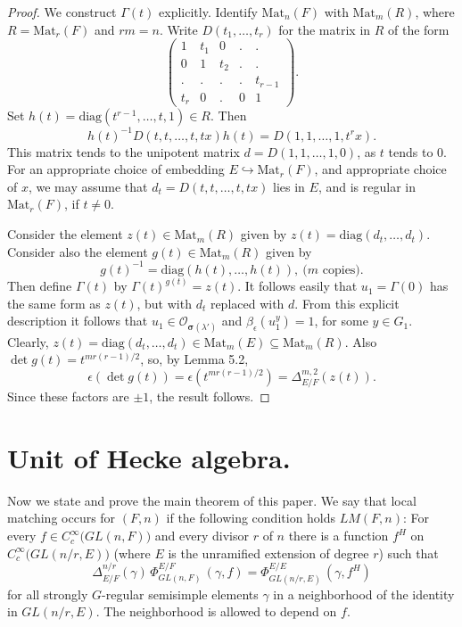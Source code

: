 \documentclass{amsart}
\begin{document}
\begin{proof}  We construct $\Gamma(t)$ explicitly.  Identify
$\text{Mat}_n(F)$ with $\text{Mat}_m(R)$, where $R = \text{Mat}_r(F)$
and $rm=n$.  Write $D(t_1,\ldots,t_r)$ for the matrix in $R$ of the
form
$$\begin{pmatrix} 1& t_1& 0 & . & . \\
	   0& 1  & t_2&. &.  \\
	   .& .  & .  &. &t_{r-1}\\
	   t_r&0 & . & 0 &1\end{pmatrix}.$$
Set $h(t) = \text{diag}(t^{r-1},\ldots,t,1)\in R$.  Then
$$h(t)^{-1}D(t,t,\ldots,t,tx)h(t) = D(1,1,\ldots,1,t^rx).$$  This
matrix tends to the unipotent matrix
  $d = D(1,1,\ldots,1,0)$, as $t$ tends to $0$.  For an
appropriate choice of embedding $E\hookrightarrow \text{Mat}_r(F)$, 
and appropriate
choice of $x$, we may assume that $d_t=D(t,t,\ldots,t,tx)$ lies in $E$,
and is regular in $\text{Mat}_r(F)$, if $t\ne 0$.

Consider the element $z(t) \in \text{Mat}_m(R)$ given by
$z(t) = \text{diag}(d_t,\ldots,d_t)$.
Consider also the element $g(t) \in \text{Mat}_m(R)$ given by
$$g(t)^{-1} = \text{diag}(h(t),\ldots,h(t)),\ \text{($m$ copies)}.$$
Then define $\Gamma(t)$ by
  $\Gamma(t)^{g(t)}= z(t)$.  It follows easily that
$u_1 = \Gamma(0)$ has the same form as $z(t)$, but with $d_t$ replaced
with $d$.  From this explicit description it follows that $u_1\in
{\mathcal O}_{\pmb\sigma(\lambda')}$ and $\beta_\epsilon(u_1^y)=1$, for
some $y\in G_1$.
%
Clearly, $z(t) = \text{diag}(d_t,\ldots,d_t) \in \text{Mat}_m(E) \subseteq
\text{Mat}_m(R)$.  Also $\det g(t) = t^{mr(r-1)/2}$, so, by Lemma 5.2,
$$\epsilon(\det g(t)) = \epsilon(t^{mr(r-1)/2}) = 
\Delta^{m,2}_{E/F}(z(t)).$$
Since these factors are $\pm1$, the result follows.
\end{proof}


\section{{Unit of Hecke algebra.}}

\medskip
\noindent
Now we state and prove the main theorem of this paper.
We say that local matching occurs for
  $ (F, n ) $
if the following condition holds
  $ LM(F,n) $: 
For every
  $ f \in C_c^{\infty}
    \bigl(
      GL(n, F)
    \bigr) $
and every divisor $r$ of $n$
there is a function
  $ f^H $
on
  $ C_c^{\infty}
    \bigl(
        GL ( n / r, E )
    \bigr) $
(where $E$ is the unramified extension of degree
  $ r $)
such that
%
$$
  \Delta_{E/F}^{n/r}
  (\gamma) \,
  \Phi_{GL(n, F)}^{E/F} \,
  (\gamma, f) =
  \Phi_{GL(n/r, E)}^{E/E} \,
  (\gamma, f^H)
$$
%
for all strongly $G$-regular semisimple elements
  $ \gamma $
in a neighborhood of the identity in
  $ GL (n/r, E) $.
The neighborhood is allowed to depend on $f$.
\end{document}
